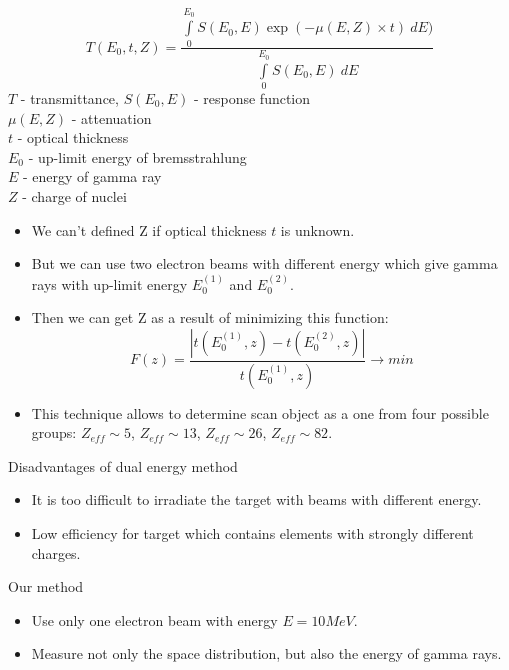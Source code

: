 \documentclass[a4paper]{panl}
\begin{document}
            $$
T(E_0, t, Z) = \frac{\int \limits_0^{E_0} S(E_0, E) \exp(-\mu(E,Z)\times t)~dE)}{\int \limits_0^{E_0} S(E_0, E)~dE}
$$
            $T$ -  transmittance, $S(E_0, E)$ - response function\\
$\mu(E,Z)$ - attenuation\\
$t$ -  optical thickness\\
$E_0$ -  up-limit energy of bremsstrahlung\\
$E$ - energy of gamma ray\\
$Z$ - charge of nuclei 
        \begin{itemize}
    \item We can't defined Z if optical thickness $t$ is unknown.
    \item But we can use two electron beams with different energy which give gamma rays with up-limit energy $E^{(1)}_0$ and $E^{(2)}_0$.
    \item Then we can get Z as a result of minimizing this function:
    $$
    F(z) = \frac{|t(E^{(1)}_0,z) - t(E^{(2)}_0,z)|}{t(E^{(1)}_0,z)} \to min
    $$
    \item This technique allows to determine scan object as a one from four possible groups: $Z_{eff} \sim 5$, $Z_{eff} \sim 13$, $Z_{eff} \sim 26$, $Z_{eff} \sim 82$.
\end{itemize}
Disadvantages of dual energy method
    \begin{itemize}
        \item It is too difficult to irradiate the target with beams with different energy.
        \item Low efficiency for target which contains elements with strongly different charges.
    \end{itemize}
Our method
    \begin{itemize}
        \item Use only one electron beam with energy $E = 10 MeV$.
        \item Measure not only the space distribution, but also the energy of gamma rays.
    \end{itemize}
\end{document}
